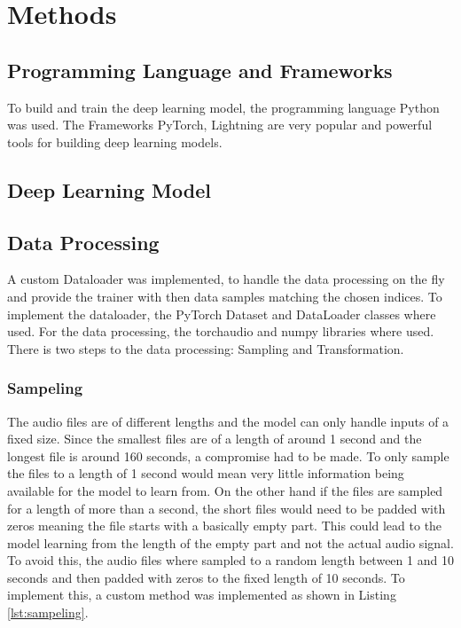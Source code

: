 

\section{Methods}
\label{methods}

\subsection{Programming Language and Frameworks}
To build and train the deep learning model, the programming language Python was used.
The Frameworks PyTorch, Lightning are very popular and powerful tools for building deep learning models.

\subsection{Deep Learning Model}

\subsection{Data Processing}
A custom Dataloader was implemented, to handle the data processing on the fly
and provide the trainer with then data samples matching the chosen indices.
To implement the dataloader, the PyTorch Dataset and DataLoader classes where used.
For the data processing, the torchaudio and numpy libraries where used.
There is two steps to the data processing: Sampling and Transformation.

\subsubsection{Sampeling}
The audio files are of different lengths and the model can only handle inputs of a fixed size.
Since the smallest files are of a length of around 1 second and the longest file is around
160 seconds, a compromise had to be made. To only sample the files to a length of 1 second
would mean very little information being available for the model to learn from. On the other
hand if the files are sampled for a length of more than a second, the short files would need
to be padded with zeros meaning the file starts with a basically empty part. This could lead
to the model learning from the length of the empty part and not the actual audio signal.
To avoid this, the audio files where sampled to a random length between 1 and 10 seconds and
then padded with zeros to the fixed length of 10 seconds. To implement this, a custom method
was implemented as shown in Listing \ref{lst:sampeling}.

